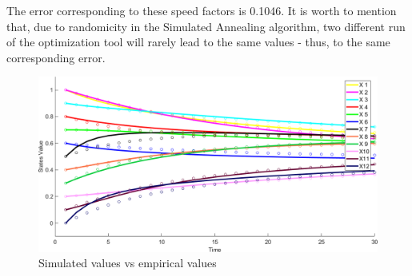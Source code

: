 \documentclass[a4paper]{article}
\begin{document}
The error corresponding to these speed factors is 0.1046. It is worth to mention that, due to randomicity in the Simulated Annealing algorithm, two different run of the optimization tool will rarely lead to the same values - thus, to the same corresponding error.

\begin{figure}[H]
\center
\includegraphics[width=\textwidth]{res/img/plotdiff2}
\caption{Simulated values vs empirical values }
\label{fig:plotdiff2}
\end{figure}
\end{document}

